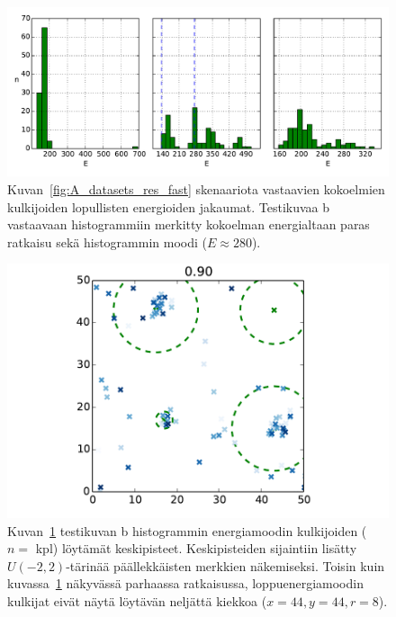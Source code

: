 \begin{figure}[htpb]
    \centering
    \includegraphics[width=1.0\linewidth]{figures/A_final_histo3_fast.pdf}
    \caption{Kuvan~\ref{fig:A_datasets_res_fast} skenaariota vastaavien kokoelmien kulkijoiden lopullisten energioiden jakaumat.
        Testikuvaa b vastaavaan histogrammiin merkitty kokoelman energialtaan paras ratkaisu sekä histogrammin moodi ($E \approx 280$).
        \label{fig:A_final_histo3_fast}
    }
\end{figure}


\begin{figure}[htpb]
    \centering
    \includegraphics[width=1.0\linewidth]{figures/A_modalbin_cc_fast_1.pdf}
    \caption{Kuvan~\ref{fig:A_final_histo3_fast} testikuvan b histogrammin energiamoodin kulkijoiden ($n = $ kpl) löytämät keskipisteet.
        Keskipisteiden sijaintiin lisätty $U(-2,2)$-tärinää päällekkäisten merkkien näkemiseksi.
        Toisin kuin kuvassa~\ref{fig:A_final_histo3_fast} näkyvässä parhaassa ratkaisussa, loppuenergiamoodin kulkijat eivät näytä löytävän neljättä kiekkoa ($x = 44, y = 44, r = 8$).
        \label{fig:A_modalbin_cc_fast_1}
    }
\end{figure}

